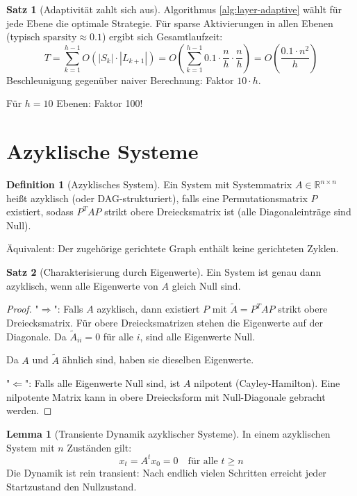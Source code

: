 ﻿\documentclass[a4paper,12pt]{report}
\theoremstyle{definition}
\newtheorem{definition}{Definition}
\newtheorem{satz}{Satz}
\newtheorem{lemma}{Lemma}
\begin{document}
	\begin{satz}[Adaptivität zahlt sich aus]
		Algorithmus \ref{alg:layer-adaptive} wählt für jede Ebene die optimale Strategie. Für sparse Aktivierungen in allen Ebenen (typisch $\text{sparsity} \approx 0.1$) ergibt sich Gesamtlaufzeit:
		\[
		T = \sum_{k=1}^{h-1} O(|S_k| \cdot |L_{k+1}|) = O\left(\sum_{k=1}^{h-1} 0.1 \cdot \frac{n}{h} \cdot \frac{n}{h}\right) = O\left(\frac{0.1 \cdot n^2}{h}\right)
		\]
		Beschleunigung gegenüber naiver Berechnung: Faktor $10 \cdot h$.
		
		Für $h = 10$ Ebenen: Faktor 100!
	\end{satz}
	
	\section{Azyklische Systeme}
	
	\begin{definition}[Azyklisches System]
		Ein System mit Systemmatrix $A \in \mathbb{R}^{n \times n}$ heißt azyklisch (oder DAG-strukturiert), falls eine Permutationsmatrix $P$ existiert, sodass $P^T A P$ strikt obere Dreiecksmatrix ist (alle Diagonaleinträge sind Null).
		
		Äquivalent: Der zugehörige gerichtete Graph enthält keine gerichteten Zyklen.
	\end{definition}
	
	\begin{satz}[Charakterisierung durch Eigenwerte]
		Ein System ist genau dann azyklisch, wenn alle Eigenwerte von $A$ gleich Null sind.
	\end{satz}
	
	\begin{proof}
		"$\Rightarrow$": Falls $A$ azyklisch, dann existiert $P$ mit $\tilde{A} = P^T A P$ strikt obere Dreiecksmatrix. Für obere Dreiecksmatrizen stehen die Eigenwerte auf der Diagonale. Da $\tilde{A}_{ii} = 0$ für alle $i$, sind alle Eigenwerte Null.
		
		Da $A$ und $\tilde{A}$ ähnlich sind, haben sie dieselben Eigenwerte.
		
		"$\Leftarrow$": Falls alle Eigenwerte Null sind, ist $A$ nilpotent (Cayley-Hamilton). Eine nilpotente Matrix kann in obere Dreiecksform mit Null-Diagonale gebracht werden.
	\end{proof}
	
	\begin{lemma}[Transiente Dynamik azyklischer Systeme]
		In einem azyklischen System mit $n$ Zuständen gilt:
		\[
		x_t = A^t x_0 = 0 \quad \text{für alle } t \geq n
		\]
		Die Dynamik ist rein transient: Nach endlich vielen Schritten erreicht jeder Startzustand den Nullzustand.
	\end{lemma}
	
\end{document}
